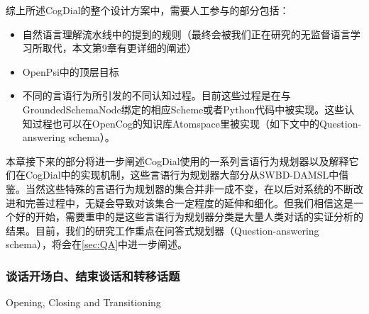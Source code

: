 综上所述CogDial的整个设计方案中，需要人工参与的部分包括：
\begin{itemize}
\item 自然语言理解流水线中的提到的规则（最终会被我们正在研究的无监督语言学习所取代，本文第9章有更详细的阐述）
\item OpenPsi中的顶层目标
\item 不同的言语行为所引发的不同认知过程。目前这些过程是在与GroundedSchemaNode绑定的相应Scheme或者Python代码中被实现。这些认知过程也可以在OpenCog的知识库Atomspace里被实现（如下文中的Question-answering schema）。
\end{itemize}
本章接下来的部分将进一步阐述CogDial使用的一系列言语行为规划器以及解释它们在CogDial中的实现机制，这些言语行为规划器大部分从SWBD-DAMSL中借鉴。当然这些特殊的言语行为规划器的集合并非一成不变，在以后对系统的不断改进和完善过程中，无疑会导致对该集合一定程度的延伸和细化。但我们相信这是一个好的开始，需要重申的是这些言语行为规划器分类是大量人类对话的实证分析的结果。目前，我们的研究工作重点在问答式规划器（Question-answering schema），将会在\ref{sec:QA}中进一步阐述。

\subsubsection{谈话开场白、结束谈话和转移话题}{Opening, Closing and Transitioning}

